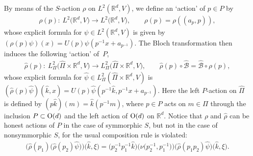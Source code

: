 \documentclass[pdftex]{sigma}
\theoremstyle{definition}
\newcommand{\R}{\mathbb{R}}
\begin{document}
By means of the $S$-action $\rho$ on $L^2(\R^d, V)$, we def\/ine an `action' of $p \in P$ by
\begin{gather*}
\rho(p) \colon \ L^2\big(\R^d, V\big) \longrightarrow L^2\big(\R^d, V\big), \qquad \rho(p) = \rho((a_p, p)),
\end{gather*}
whose explicit formula for $\psi \in L^2(\R^d, V)$ is given by $(\rho(p) \psi)(x) = U(p) \psi(p^{-1} x + a_{p^{-1}})$. The Bloch transformation then induces the following `action' of~$P$,
\begin{gather*}
\hat{\rho}(p) \colon \ L^2_{\Pi}\big(\hat{\Pi} \times \R^d, V\big)
\to L^2_{\Pi}\big(\hat{\Pi} \times \R^d, V\big), \qquad \hat{\rho}(p) \circ \hat{\mathcal{B}} = \hat{\mathcal{B}} \circ \rho(p),
\end{gather*}
whose explicit formula for $\hat{\psi} \in L^2_{\Pi}(\hat{\Pi} \times \R^d, V)$ is
$(\hat{\rho}(p)\hat{\psi})(\hat{k}, x)= U(p) \hat{\psi}(p^{-1}\hat{k}, p^{-1}x + a_{p^{-1}})$.
Here the left $P$-action on $\hat{\Pi}$ is def\/ined by $(p\hat{k})(m) = \hat{k}(p^{-1}m)$, where $p \in P$ acts on $m \in \Pi$ through the inclusion $P \subset {\rm O}(d)$ and the left action of ${\rm O}(d)$ on $\R^d$. Notice that $\rho$ and $\hat{\rho}$ can be honest actions of $P$ in the case of symmorphic $S$, but not in the case of nonsymmorphic $S$, for the usual composition rule is violated:
\begin{gather*}
\big(\hat{\rho}(p_1)\big(\hat{\rho}(p_2)\hat{\psi}\big)\big)\big(\hat{k}, \xi\big)
= \big(p_2^{-1}p_1^{-1}\hat{k}\big)\big(\nu\big(p_2^{-1}, p_1^{-1}\big)\big)
\big(\hat{\rho}(p_1p_2)\hat{\psi}\big)\big(\hat{k}, \xi\big).
\end{gather*}
\end{document}
